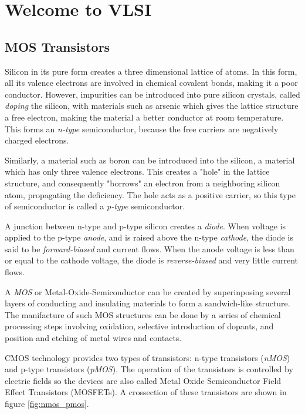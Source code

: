 \section{Welcome to VLSI}

\subsection{MOS Transistors}
Silicon in its pure form creates a three dimensional lattice of atoms. In this form, all its valence electrons are 
involved in chemical covalent bonds, making it a poor conductor. However, impurities can be introduced into pure
silicon crystals, called \textit{doping} the silicon, with materials such as arsenic which gives the lattice 
structure a free electron, making the material a better conductor at room temperature. This forms an \textit{n-type}
semiconductor, because the free carriers are negatively charged electrons. 

Similarly, a material such as boron can be introduced into the silicon, a material which has only three valence electrons.
This creates a "hole" in the lattice structure, and consequently "borrows" an electron from a neighboring silicon atom, 
propagating the deficiency. The hole acts as a positive carrier, so this type of semiconductor is called a \textit{p-type} 
semiconductor. 

A junction between n-type and p-type silicon creates a \textit{diode}. When voltage is applied to the p-type \textit{anode}, 
and is raised above the n-type \textit{cathode}, the diode is said to be \textit{forward-biased} and current flows.
When the anode voltage is less than or equal to the cathode voltage, the diode is \textit{reverse-biased} 
and very little current flows.

A \textit{MOS} or Metal-Oxide-Semiconductor can be created by superinposing several layers of conducting and insulating materials 
to form a sandwich-like structure. The manifacture of such MOS structures can be done by a series of chemical processing steps 
involving oxidation, selective introduction of dopants, and position and etching of metal wires and contacts.

CMOS technology provides two types of transistors: n-type transistors (\textit{nMOS}) and p-type transistors (\textit{pMOS}).
The operation of the transistors is controlled by electric fields so the devices are also called 
Metal Oxide Semiconductor Field Effect Transistors (MOSFETs). A crossection of these transistors are shown in figure \ref{fig:nmos_pmos}.

